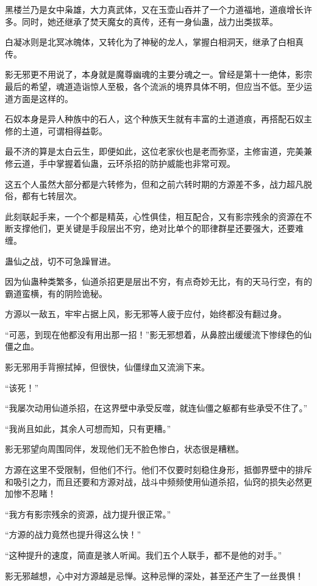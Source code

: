 \begin{this_body}
黑楼兰乃是女中枭雄，大力真武体，又在玉壶山吞并了一个力道福地，道痕增长许多。同时，她还继承了焚天魔女的真传，还有一身仙蛊，战力出类拔萃。

白凝冰则是北冥冰魄体，又转化为了神秘的龙人，掌握白相洞天，继承了白相真传。

影无邪更不用说了，本身就是魔尊幽魂的主要分魂之一。曾经是第十一绝体，影宗最后的希望，魂道造诣惊人至极，各个流派的境界具体不明，但应当不低。至少运道方面是这样的。

石奴本身是异人种族中的石人，这个种族天生就有丰富的土道道痕，再搭配石奴主修的土道，可谓相得益彰。

最不济的算是太白云生，即便如此，这位老家伙也是老而弥坚，主修宙道，完美兼修云道，手中掌握着仙蛊，云环杀招的防护威能也非常可观。

这五个人虽然大部分都是六转修为，但和之前六转时期的方源差不多，战力超凡脱俗，都有七转层次。

此刻联起手来，一个个都是精英，心性俱佳，相互配合，又有影宗残余的资源在不断支撑他们，更关键是手段层出不穷，绝对比单个的耶律群星还要强大，还要难缠。

蛊仙之战，切不可急躁冒进。

因为仙蛊种类繁多，仙道杀招更是层出不穷，有点奇妙无比，有的天马行空，有的霸道蛮横，有的阴险诡秘。

方源以一敌五，牢牢占据上风，影无邪等人疲于应付，始终都没有翻过身。

“可恶，到现在他都没有用出那一招！”影无邪想着，从鼻腔出缓缓流下惨绿色的仙僵之血。

影无邪用手背擦拭掉，但很快，仙僵绿血又流淌下来。

“该死！”

“我屡次动用仙道杀招，在这界壁中承受反噬，就连仙僵之躯都有些承受不住了。”

“我尚且如此，其余人可想而知，只有更糟。”

影无邪望向周围同伴，发现他们无不脸色惨白，状态很是糟糕。

方源在这里不受限制，但他们不行。他们不仅要时刻稳住身形，抵御界壁中的排斥和吸引之力，而且还要和方源对战，战斗中频频使用仙道杀招，仙窍的损失必然更加惨不忍睹！

“我方有影宗残余的资源，战力提升很正常。”

“方源的战力竟然也提升得这么快！”

“这种提升的速度，简直是骇人听闻。我们五个人联手，都不是他的对手。”

影无邪越想，心中对方源越是忌惮。这种忌惮的深处，甚至还产生了一丝畏惧！


\end{this_body}
